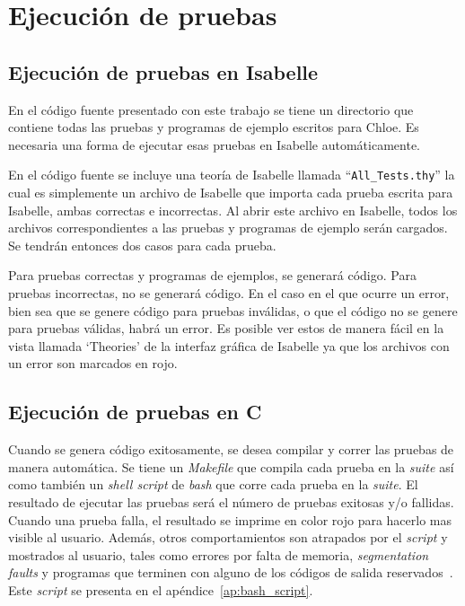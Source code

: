 \section{Ejecución de pruebas}

\subsection{Ejecución de pruebas en Isabelle}

En el código fuente presentado con este trabajo se tiene un directorio que contiene todas las pruebas y programas de ejemplo escritos para Chloe.
Es necesaria una forma de ejecutar esas pruebas en Isabelle automáticamente.

En el código fuente se incluye una teoría de Isabelle llamada ``\verb|All_Tests.thy|'' la cual es simplemente un archivo de Isabelle que importa cada prueba escrita para Isabelle, ambas correctas e incorrectas.
Al abrir este archivo en Isabelle, todos los archivos correspondientes a las pruebas y programas de ejemplo serán cargados.
Se tendrán entonces dos casos para cada prueba.

Para pruebas correctas y programas de ejemplos, se generará código.
Para pruebas incorrectas, no se generará código.
En el caso en el que ocurre un error, bien sea que se genere código para pruebas inválidas, o que el código no se genere para pruebas válidas, habrá un error.
Es posible ver estos de manera fácil en la vista llamada `Theories' de la interfaz gráfica de Isabelle ya que los archivos con un error son marcados en rojo.

\subsection{Ejecución de pruebas en C}

Cuando se genera código exitosamente, se desea compilar y correr las pruebas de manera automática.
Se tiene un \textit{Makefile} que compila cada prueba en la \textit{suite} así como también un \textit{shell script} de \textit{bash} que corre cada prueba en la \textit{suite}.
El resultado de ejecutar las pruebas será el número de pruebas exitosas y/o fallidas.
Cuando una prueba falla, el resultado se imprime en color rojo para hacerlo mas visible al usuario.
Además, otros comportamientos son atrapados por el \textit{script} y mostrados al usuario, tales como errores por falta de memoria, \textit{segmentation faults} y programas que terminen con alguno de los códigos de salida reservados~\citep{bash-scripting}.
Este \textit{script} se presenta en el apéndice~\ref{ap:bash_script}.

